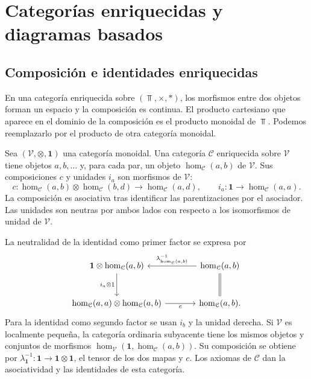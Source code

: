 \section{Categorías enriquecidas y diagramas basados}

\subsection{Composición e identidades enriquecidas}

En una categoría enriquecida sobre $(\Top,\times,*)$, los morfismos entre dos objetos forman un espacio y la composición es continua. El producto cartesiano que aparece en el dominio de la composición es el producto monoidal de $\Top$. Podemos reemplazarlo por el producto de otra categoría monoidal.

\begin{defi}\label{defi:c26-enriquecida}
Sea $(\mathcal V,\otimes,\mathbf1)$ una categoría monoidal. Una categoría $\mathcal C$ enriquecida sobre $\mathcal V$ tiene objetos $a,b,\ldots$ y, para cada par, un objeto $\hom_{\mathcal C}(a,b)$ de $\mathcal V$. Sus composiciones $c$ y unidades $i_a$ son morfismos de $\mathcal V$:
\[
c\colon \hom_{\mathcal C}(a,b)\otimes\hom_{\mathcal C}(b,d)
\longrightarrow \hom_{\mathcal C}(a,d),
\qquad
i_a\colon\mathbf1\longrightarrow\hom_{\mathcal C}(a,a).
\]
La composición es asociativa tras identificar las parentizaciones por el asociador. Las unidades son neutras por ambos lados con respecto a los isomorfismos de unidad de $\mathcal V$.
\end{defi}

La neutralidad de la identidad como primer factor se expresa por
\[
\begin{tikzcd}[column sep=large,row sep=large]
\mathbf1\otimes \hom_{\mathcal C}(a,b)
\arrow[d,"i_a\otimes1"']&
\hom_{\mathcal C}(a,b)\arrow[l,"\lambda_{\hom_{\mathcal C}(a,b)}^{-1}"']\arrow[d,equal]\\
\hom_{\mathcal C}(a,a)\otimes \hom_{\mathcal C}(a,b)\arrow[r,"c"']&\hom_{\mathcal C}(a,b).
\end{tikzcd}
\]
Para la identidad como segundo factor se usan $i_b$ y la unidad derecha. Si $\mathcal V$ es localmente pequeña, la categoría ordinaria subyacente tiene los mismos objetos y conjuntos de morfismos $\hom_{\mathcal V}(\mathbf1,\hom_{\mathcal C}(a,b))$. Su composición se obtiene por $\lambda_{\mathbf1}^{-1}\colon\mathbf1\to\mathbf1\otimes\mathbf1$, el tensor de los dos mapas y $c$. Los axiomas de $\mathcal C$ dan la asociatividad y las identidades de esta categoría.

